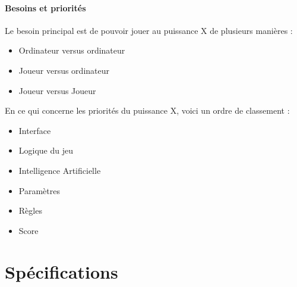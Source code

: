 \documentclass[a4paper,oneside]{article}
\begin{document}
\paragraph{Besoins et priorités\\}
Le besoin principal est de pouvoir jouer au puissance X de plusieurs manières :
\begin{itemize}
	\item Ordinateur versus ordinateur
	\item Joueur versus ordinateur
	\item Joueur versus Joueur
\end{itemize}

En ce qui concerne les priorités du puissance X, voici  un ordre de classement :
\begin{itemize}
	\item Interface
	\item Logique du jeu
	\item Intelligence Artificielle
	\item Paramètres
	\item Règles
	\item Score
\end{itemize}



\newpage

\section{Spécifications}
\end{document}
